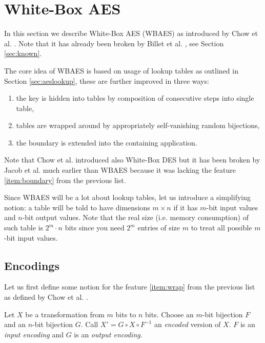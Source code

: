 \section{White-Box AES}
\label{sec:wbaes}

In this section we describe White-Box AES (WBAES) as introduced by Chow et al. \cite{chow2003aes}. Note that it has already been broken by Billet et al. \cite{billet2005cryptanalysis}, see Section \ref{sec:known}.   %

The core idea of WBAES is based on usage of lookup tables as outlined in Section \ref{sec:aeslookup}, these are further improved in three ways:
\begin{enumerate}
	\item the key is hidden into tables by composition of consecutive steps into single table,
	\item tables are wrapped around by appropriately self-vanishing random bijections, \label{item:wrap}
	\item the boundary is extended into the containing application. \label{item:boundary}
\end{enumerate}
Note that Chow et al. introduced also White-Box DES \cite{chow2003des} but it has been broken by Jacob et al. \cite{jacob2003attacking} much earlier than WBAES because it was lacking the feature \ref{item:boundary} from the previous list.

\begin{notion}
\label{notion:table}
	Since WBAES will be a lot about lookup tables, let us introduce a simplifying notion: a table will be told to have dimensions $m\times n$ if it has $m$-bit input values and $n$-bit output values. Note that the real size (i.e. memory consumption) of such table is $2^m\cdot n$ bits since you need $2^m$ entries of size $m$ to treat all possible $m$-bit input values.
\end{notion}

\subsection{Encodings}

Let us first define some notion for the feature \ref{item:wrap} from the previous list as defined by Chow et al. \cite{chow2003aes}.

\begin{defn}[Encoding]
	Let $X$ be a transformation from $m$ bits to $n$ bits. Choose an $m$-bit bijection $F$ and an $n$-bit bijection $G$. Call $X' = G \circ X \circ F^{-1}$ an {\em encoded} version of $X$. $F$ is an {\em input encoding} and $G$ is an {\em output encoding}.
\end{defn}

